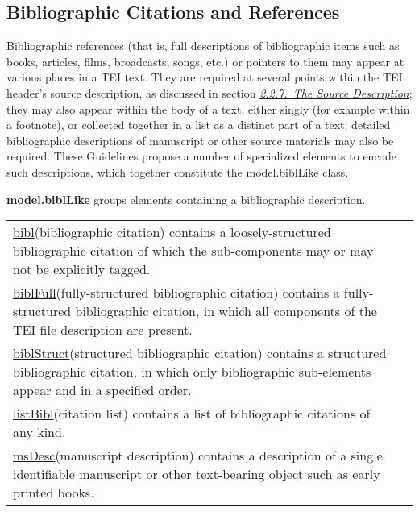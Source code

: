 \subsection[{Bibliographic Citations and References}]{Bibliographic Citations and References}\label{COBI}\par
Bibliographic references (that is, full descriptions of bibliographic items such as books, articles, films, broadcasts, songs, etc.) or pointers to them may appear at various places in a TEI text. They are required at several points within the TEI header's source description, as discussed in section \textit{\hyperref[HD3]{2.2.7.\ The Source Description}}; they may also appear within the body of a text, either singly (for example within a footnote), or collected together in a list as a distinct part of a text; detailed bibliographic descriptions of manuscript or other source materials may also be required. These Guidelines propose a number of specialized elements to encode such descriptions, which together constitute the \textsf{model.biblLike} class. 
\begin{sansreflist}
  
\item [\textbf{model.biblLike}] groups elements containing a bibliographic description. \par 
\begin{longtable}{P{0.1619538834951456\textwidth}P{0.6880461165048544\textwidth}}
\hyperref[TEI.bibl]{bibl}\tabcellsep (bibliographic citation) contains a loosely-structured bibliographic citation of which the sub-components may or may not be explicitly tagged.\\
\hyperref[TEI.biblFull]{biblFull}\tabcellsep (fully-structured bibliographic citation) contains a fully-structured bibliographic citation, in which all components of the TEI file description are present.\\
\hyperref[TEI.biblStruct]{biblStruct}\tabcellsep (structured bibliographic citation) contains a structured bibliographic citation, in which only bibliographic sub-elements appear and in a specified order.\\
\hyperref[TEI.listBibl]{listBibl}\tabcellsep (citation list) contains a list of bibliographic citations of any kind.\\
\hyperref[TEI.msDesc]{msDesc}\tabcellsep (manuscript description) contains a description of a single identifiable manuscript or other text-bearing object such as early printed books.\end{longtable} \par
 
\end{sansreflist}
